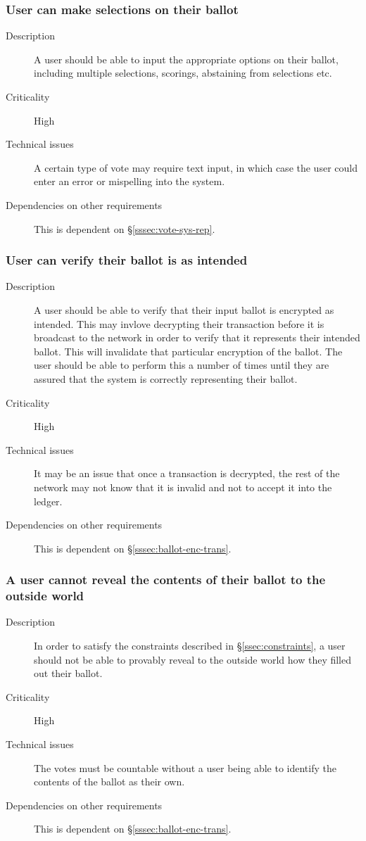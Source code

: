 \documentclass[a4paper,12pt]{article}
\begin{document}
\subsubsection{User can make selections on their ballot}
\begin{description}
	\item[Description]
		A user should be able to input the appropriate options on their ballot, including multiple selections, scorings, abstaining from selections etc.
	\item[Criticality]
		High
	\item[Technical issues]
		A certain type of vote may require text input, in which case the user could enter an error or mispelling into the system.
	\item[Dependencies on other requirements]
		This is dependent on \S\ref{sssec:vote-sys-rep}.
\end{description}

\subsubsection{User can verify their ballot is as intended}
\begin{description}
	\item[Description]
		A user should be able to verify that their input ballot is encrypted as intended. This may invlove decrypting their transaction before it is broadcast to the network in order to verify that it represents their intended ballot. This will invalidate that particular encryption of the ballot. The user should be able to perform this a number of times until they are assured that the system is correctly representing their ballot.
	\item[Criticality]
		High
	\item[Technical issues]
		It may be an issue that once a transaction is decrypted, the rest of the network may not know that it is invalid and not to accept it into the ledger.
	\item[Dependencies on other requirements]
		This is dependent on \S\ref{sssec:ballot-enc-trans}.
\end{description}

\subsubsection{A user cannot reveal the contents of their ballot to the outside world}
\begin{description}
	\item[Description]
		In order to satisfy the constraints described in \S\ref{ssec:constraints}, a user should not be able to provably reveal to the outside world how they filled out their ballot.
	\item[Criticality]
		High
	\item[Technical issues]
		The votes must be countable without a user being able to identify the contents of the ballot as their own.
	\item[Dependencies on other requirements]
		This is dependent on \S\ref{sssec:ballot-enc-trans}.
\end{description}
\end{document}
